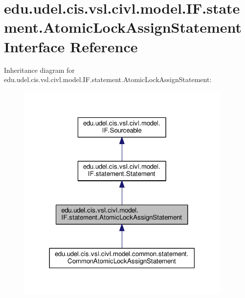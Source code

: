 \hypertarget{interfaceedu_1_1udel_1_1cis_1_1vsl_1_1civl_1_1model_1_1IF_1_1statement_1_1AtomicLockAssignStatement}{}\section{edu.\+udel.\+cis.\+vsl.\+civl.\+model.\+I\+F.\+statement.\+Atomic\+Lock\+Assign\+Statement Interface Reference}
\label{interfaceedu_1_1udel_1_1cis_1_1vsl_1_1civl_1_1model_1_1IF_1_1statement_1_1AtomicLockAssignStatement}


Inheritance diagram for edu.\+udel.\+cis.\+vsl.\+civl.\+model.\+I\+F.\+statement.\+Atomic\+Lock\+Assign\+Statement\+:
\nopagebreak
\begin{figure}[H]
\begin{center}
\leavevmode
\includegraphics[width=302pt]{interfaceedu_1_1udel_1_1cis_1_1vsl_1_1civl_1_1model_1_1IF_1_1statement_1_1AtomicLockAssignStatement__inherit__graph}
\end{center}
\end{figure}


